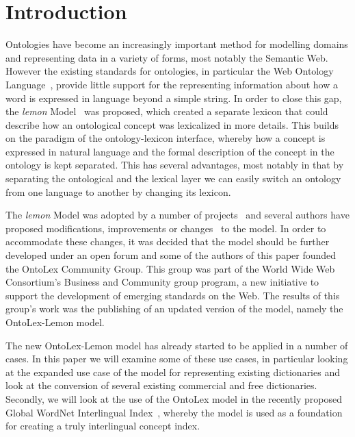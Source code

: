 \documentclass[12pt,a4paper]{elex2017}
\begin{document}

\section{Introduction}

Ontologies have become an increasingly important method for modelling domains and
representing data in a variety of forms, most notably the Semantic Web. However
the existing standards for ontologies, in particular the Web Ontology
Language~\citep[OWL]{mcguinness2004ow}, provide little support for the
representing information about how a word is expressed in language beyond a
simple string. In order to close this gap, the \emph{lemon}
Model~\citep{mccrae2012interchanging} was proposed, which created a separate
lexicon that could describe how an ontological concept was lexicalized in more
details. This builds on the paradigm of the ontology-lexicon interface, whereby
how a concept is expressed in natural language and the formal
description of the concept in the ontology is kept separated. This has several
advantages, most notably in that by separating the ontological and the lexical
layer we can easily switch an ontology from one language to another by changing
its lexicon. 

The \emph{lemon} Model was adopted by a number of
projects~\citep{ehrmann_lrec2014_representinMultilingual,navigli2012babelnet,serasset2015dbnary,ecklekohler2015} and
several authors have proposed modifications, improvements or
changes~\citep{khan2014using,chavula2014lemon,bosque2016linked,gracia_lrec2014_translation}
to the model. In order to accommodate these changes, it was decided that the
model should be further developed under an open forum and some of the
authors of this paper founded the OntoLex Community Group. This group was part
of the World Wide Web Consortium's Business and Community group program, a new
initiative to support the development of emerging standards on the Web. The
results of this group's work was the publishing of an updated version of the
model, namely the OntoLex-Lemon model.

The new OntoLex-Lemon model has already started to be applied in a number of cases. In this paper we will examine some of these use cases,
in particular looking at the
expanded use case of the model for representing existing dictionaries and look
at the conversion of several existing commercial and free dictionaries. Secondly, we will look at the
use of the OntoLex model in the recently proposed Global WordNet Interlingual
Index~\citep{vossen2016toward,bond2016cili}, whereby the model is used as a
foundation for creating a truly interlingual concept index.
\end{document}
